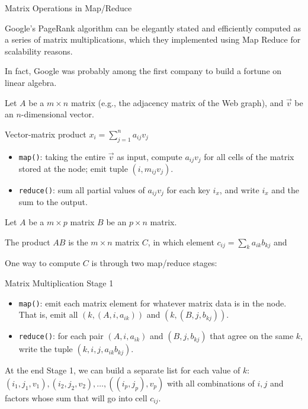 %
%


\begin{frame}{Matrix Operations in Map/Reduce}

Google's PageRank algorithm can be elegantly stated and efficiently computed as a series of matrix multiplications, which they implemented using Map Reduce for scalability reasons.

In fact, Google was probably among the first company to build a fortune on linear algebra.

Let $A$ be a $m\times n$ matrix (e.g., the adjacency matrix of the Web graph), and $\vec{v}$ be an $n$-dimensional vector.

\begin{block}{Vector-matrix product $x_i=\displaystyle\sum_{j=1}^{n}a_{ij}v_j$}
\begin{itemize}[-,noitemsep]
\item \lstinline{map()}: taking the entire $\vec{v}$ as input, compute $a_{ij}v_j$ for all cells of the matrix stored at the node; emit tuple $(i, m_{ij}v_j)$.
\item \lstinline{reduce()}: sum all partial values of $a_{ij}v_j$ for each key $i_x$, and write $i_x$ and the sum to the output.
\end{itemize}
\end{block}
\end{frame}

%
%


\begin{frame}

Let $A$ be a $m\times p$ matrix $B$ be an $p\times n$ matrix. 

The \alert{product} $AB$ is the $m \times n$ matrix $C$, in which element $c_{ij} = \displaystyle\sum_{k} a_{ik}b_{kj}$ and 

One way to compute $C$ is through two map/reduce stages:



\begin{block}{Matrix Multiplication Stage 1}
\begin{itemize}[-,noitemsep]
\item \lstinline{map()}: emit each matrix element for whatever matrix data is in the node. That is, emit all $(k,(A, i, a_{ik}))$ and $(k,(B, j, b_{kj}))$.
\item \lstinline{reduce()}: for each pair $(A, i, a_{ik})$ and $(B, j, b_{kj})$ that agree on the same $k$, write the tuple $(k,i,j,a_{ik}b_{kj})$.
\end{itemize}
\end{block}

At the end Stage 1, we can build a separate list for each value of $k$: $(i_1, j_1, v_1), (i_2, j_2, v_2), \ldots, ((i_p, j_p), v_p)$ with all combinations of $i,j$ and factors whose sum that will go into cell $c_{ij}$.
\end{frame}


